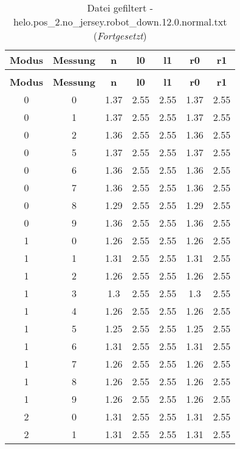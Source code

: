 \clearpage{}
\begin{longtable}{|c|c||c||c|c||c|c|}
	\caption{Datei gefiltert - helo.pos\_2.no\_jersey.robot\_down.12.0.normal.txt} \label{tab:helo.pos-2.no-jersey.robot-down.12.0.normal.txt} \\ \hline
	\textbf{Modus} & \textbf{Messung} & \textbf{n} & \textbf{l0} & \textbf{l1} & \textbf{r0} & \textbf{r1}\\ \hline
	\endfirsthead
	\caption[]{Datei gefiltert - helo.pos\_2.no\_jersey.robot\_down.12.0.normal.txt (\emph{Fortgesetzt})} \\ \hline
	\textbf{Modus} & \textbf{Messung} & \textbf{n} & \textbf{l0} & \textbf{l1} & \textbf{r0} & \textbf{r1}\\ \hline
	\endhead
	0 & 0 & 1.37 & 2.55 & 2.55 & 1.37 & 2.55 \\ \hline
	0 & 1 & 1.37 & 2.55 & 2.55 & 1.37 & 2.55 \\ \hline
	0 & 2 & 1.36 & 2.55 & 2.55 & 1.36 & 2.55 \\ \hline
	0 & 5 & 1.37 & 2.55 & 2.55 & 1.37 & 2.55 \\ \hline
	0 & 6 & 1.36 & 2.55 & 2.55 & 1.36 & 2.55 \\ \hline
	0 & 7 & 1.36 & 2.55 & 2.55 & 1.36 & 2.55 \\ \hline
	0 & 8 & 1.29 & 2.55 & 2.55 & 1.29 & 2.55 \\ \hline
	0 & 9 & 1.36 & 2.55 & 2.55 & 1.36 & 2.55 \\ \hline
	1 & 0 & 1.26 & 2.55 & 2.55 & 1.26 & 2.55 \\ \hline
	1 & 1 & 1.31 & 2.55 & 2.55 & 1.31 & 2.55 \\ \hline
	1 & 2 & 1.26 & 2.55 & 2.55 & 1.26 & 2.55 \\ \hline
	1 & 3 & 1.3 & 2.55 & 2.55 & 1.3 & 2.55 \\ \hline
	1 & 4 & 1.26 & 2.55 & 2.55 & 1.26 & 2.55 \\ \hline
	1 & 5 & 1.25 & 2.55 & 2.55 & 1.25 & 2.55 \\ \hline
	1 & 6 & 1.31 & 2.55 & 2.55 & 1.31 & 2.55 \\ \hline
	1 & 7 & 1.26 & 2.55 & 2.55 & 1.26 & 2.55 \\ \hline
	1 & 8 & 1.26 & 2.55 & 2.55 & 1.26 & 2.55 \\ \hline
	1 & 9 & 1.26 & 2.55 & 2.55 & 1.26 & 2.55 \\ \hline
	2 & 0 & 1.31 & 2.55 & 2.55 & 1.31 & 2.55 \\ \hline
	2 & 1 & 1.31 & 2.55 & 2.55 & 1.31 & 2.55 \\ \hline

\end{longtable}
